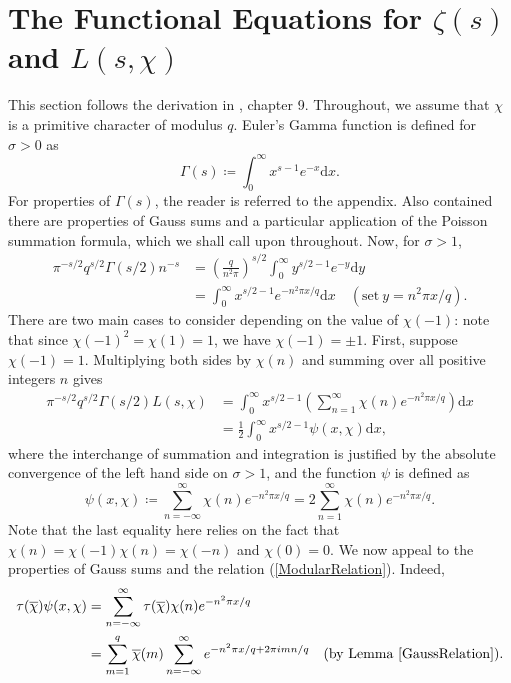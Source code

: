 \section{The Functional Equations for $\zeta(s)$ and $L(s, \chi)$}
This section follows the derivation in \cite{davenport}, chapter 9. Throughout, we assume that $\chi$ is a primitive character of modulus $q$. Euler's Gamma function is defined for $\sigma > 0$ as 
\begin{equation}
    \Gamma(s) \coloneqq \int_{0}^{\infty}x^{s - 1} e^{-x} \mathrm{d} x. \nonumber
\end{equation}
For properties of $\Gamma(s)$, the reader is referred to the appendix. Also contained there are properties of Gauss sums and a particular application of the Poisson summation formula, which we shall call upon throughout. Now, for $\sigma > 1$,
\begin{align}
    \label{FirstIdentity}
    \pi^{-s/2} q^{s/2} \Gamma(s/2) n^{-s} &= \left(\frac{q}{n^2 \pi}\right)^{s/2} \int_{0}^{\infty} y^{s/2 - 1} e^{-y} \mathrm{d} y \nonumber \\
    &= \int_{0}^{\infty} x^{s/2 - 1} e^{-n^{2} \pi x / q} \mathrm{d} x \quad (\textrm{set} \ y = n^{2}\pi x /q).
\end{align}
There are two main cases to consider depending on the value of $\chi(-1)$: note that since $\chi(-1)^{2} = \chi(1) = 1$, we have $\chi(-1) = \pm 1$. First, suppose $\chi(-1) = 1$. Multiplying both sides by $\chi(n)$ and summing over all positive integers $n$ gives
\begin{align}
    \pi^{-s/2} q^{s/2} \Gamma(s/2) L(s, \chi) &= \int_{0}^{\infty} x^{s/2 - 1} \left(\sum_{n=1}^{\infty}\chi(n) e^{-n^{2} \pi x / q} \right) \mathrm{d} x \nonumber \\
    &= \frac12 \int_{0}^{\infty} x^{s/2 - 1} \psi(x, \chi) \mathrm{d} x, \nonumber
\end{align}
where the interchange of summation and integration is justified by the absolute convergence of the left hand side on $\sigma > 1$, and the function $\psi$ is defined as
\begin{equation}
    \psi(x, \chi) \coloneqq \sum_{n=-\infty}^{\infty}\chi(n) e^{-n^{2}\pi x/q} = 2\sum_{n=1}^{\infty}\chi(n) e^{-n^{2}\pi x/q}. \nonumber
\end{equation}
Note that the last equality here relies on the fact that $\chi(n) = \chi(-1)\chi(n) = \chi(-n)$ and $\chi(0) = 0$. We now appeal to the properties of Gauss sums and the relation (\ref{ModularRelation}). Indeed,
\begin{align}
    \tau(\overline{\chi}) \psi(x, \chi) &= \sum_{n=-\infty}^{\infty} \tau(\overline{\chi}) \chi(n) e^{-n^2 \pi x / q} \nonumber \\
    &= \sum_{m=1}^{q} \overline{\chi}(m) \sum_{n=-\infty}^{\infty} e^{-n^{2} \pi x/q + 2\pi i m n / q} \quad (\textrm{by Lemma~\ref{GaussRelation}}). \nonumber
\end{align}
